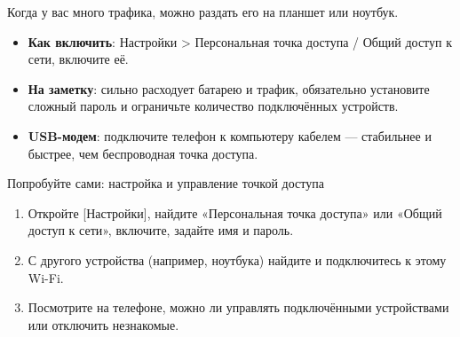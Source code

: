 
Когда у вас много трафика, можно раздать его на планшет или ноутбук.

\begin{itemize}
  \item \textbf{Как включить}: Настройки > Персональная точка доступа / Общий доступ к сети, включите её.
  \item \textbf{На заметку}: сильно расходует батарею и трафик, обязательно установите сложный пароль и ограничьте количество подключённых устройств.
  \item \textbf{USB-модем}: подключите телефон к компьютеру кабелем — стабильнее и быстрее, чем беспроводная точка доступа.
\end{itemize}

\begin{tcbpractice}{Попробуйте сами: настройка и управление точкой доступа}
\begin{enumerate}
  \item Откройте [Настройки], найдите «Персональная точка доступа» или «Общий доступ к сети», включите, задайте имя и пароль.
  \item С другого устройства (например, ноутбука) найдите и подключитесь к этому Wi-Fi.
  \item Посмотрите на телефоне, можно ли управлять подключёнными устройствами или отключить незнакомые.
\end{enumerate}

\end{tcbpractice}
